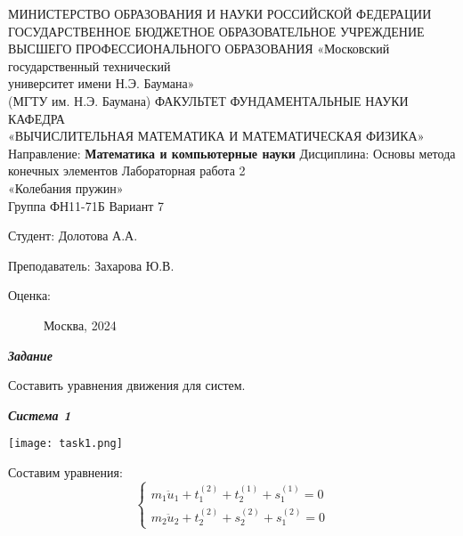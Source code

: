 \documentclass[a4paper, 12pt]{article}
\begin{document}
	\pagestyle{empty}
	\begin{center}
		МИНИСТЕРСТВО ОБРАЗОВАНИЯ И НАУКИ РОССИЙСКОЙ ФЕДЕРАЦИИ \\ ГОСУДАРСТВЕННОЕ БЮДЖЕТНОЕ ОБРАЗОВАТЕЛЬНОЕ УЧРЕЖДЕНИЕ \\ 
		ВЫСШЕГО ПРОФЕССИОНАЛЬНОГО ОБРАЗОВАНИЯ
		\vskip 1.5cm
		«Московский государственный технический \\
		университет имени Н.Э. Баумана» \\
		(МГТУ им. Н.Э. Баумана)
		\vskip 1.5cm
		ФАКУЛЬТЕТ ФУНДАМЕНТАЛЬНЫЕ НАУКИ \\
		КАФЕДРА \\
		«ВЫЧИСЛИТЕЛЬНАЯ МАТЕМАТИКА И МАТЕМАТИЧЕСКАЯ ФИЗИКА»
		\vskip 0.4cm
		Направление: \textbf{Математика и компьютерные науки}
		\vskip 0.4cm
		Дисциплина: Основы метода конечных элементов
		\vskip 0.4cm
		Лабораторная работа 2 \\
		«Колебания пружин» \\
		Группа ФН11-71Б
		\vskip 0.2cm
		Вариант 7
		
		
		\vskip 1.5cm
		\begin{flushright}
			Студент: Долотова А.А.
			
			\vskip 1.5cm
			
			Преподаватель: Захарова Ю.В.
		\end{flushright}
		Оценка:
		
		\begin{figure}[b]
			\begin{center}
				Москва, 2024
			\end{center}
		\end{figure}
		
	\end{center}
	
	\newpage
	\pagestyle{plain}

\begin{center}
\textbf{\textit{Задание}}
\end{center}

Составить уравнения движения для систем. 

\begin{center}
\textbf{\textit{Система 1}}
\end{center}

\texttt{[image: task1.png]}

Составим уравнения:
\begin{equation} \label{sist_1} 
\begin{cases}
m_1\ddot u_1 + t_1^{(2)} + t_2^{(1)} + s_1^{(1)} = 0 \\
m_2\ddot u_2 + t_2^{(2)} + s_2^{(2)} + s_1^{(2)} = 0
\end{cases}
\end{equation}
\end{document}
